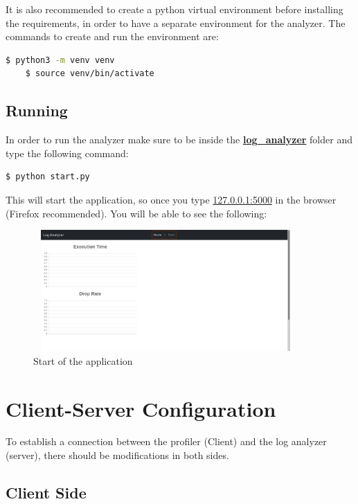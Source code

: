 It is also recommended to create a python virtual environment
before installing the requirements, in order to have a separate
environment for the analyzer. The commands to create and run the environment
are:
\newline
\begin{lstlisting}[language=bash, label={code:venv}, caption={Create and run virtual environment},captionpos=b]
	$ python3 -m venv venv	
	$ source venv/bin/activate
\end{lstlisting}


\subsection{Running} %
In order to run the analyzer make sure to be inside the
\textbf{\url{log_analyzer}} folder and type the following
command:
\newline
\begin{lstlisting}[language=bash, caption={Start application},captionpos=b]
	$ python start.py
\end{lstlisting}

This will start the application, so once you type \url{127.0.0.1:5000}
in the browser (Firefox recommended). You will be able to see the following:
\newline
\begin{figure}[H]
	\centering
	\includegraphics[width=0.9\textwidth,height=175px]{images/start.png}
	\caption{Start of the application}
	\label{fig:empty_page}
\end{figure}

\section{Client-Server Configuration} %
To establish a connection between the profiler (Client)
and the log analyzer (server), there should be modifications in both
sides.

\subsection{Client Side} \label{sec:server_side_config}


